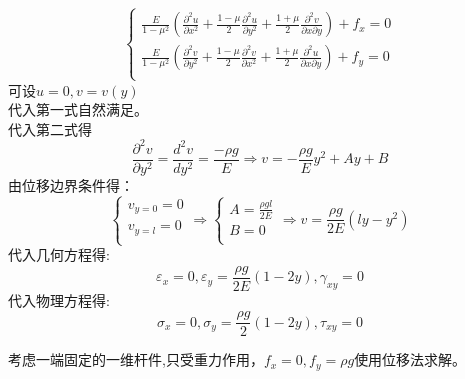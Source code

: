	\begin{remark}
		\[	\begin{cases}
		\frac{E}{1-\mu ^2}\left( \frac{\partial ^2u}{\partial x^2}+\frac{1-\mu}{2}\frac{\partial ^2u}{\partial y^2}+\frac{1+\mu}{2}\frac{\partial ^2v}{\partial x\partial y} \right) +f_x=0\\
		\frac{E}{1-\mu ^2}\left( \frac{\partial ^2v}{\partial y^2}+\frac{1-\mu}{2}\frac{\partial ^2v}{\partial x^2}+\frac{1+\mu}{2}\frac{\partial ^2u}{\partial x\partial y} \right) +f_y=0\\
		\end{cases}\]
		可设$u=0,v=v\left( y \right) $\\
		代入第一式自然满足。\\
		代入第二式得\[\frac{\partial ^2v}{\partial y^2}=\frac{d^2v}{dy^2}=\frac{-\rho g}{E}\Longrightarrow v=-\frac{\rho g}{E}y^2+Ay+B\]
		由位移边界条件得：\[\begin{cases}
		v_{y=0}=0\\
		v_{y=l}=0\\
		\end{cases}\Longrightarrow \begin{cases}
		A=\frac{\rho gl}{2E}\\
		B=0\\
		\end{cases}\Longrightarrow v=\frac{\rho g}{2E}\left( ly-y^2 \right)\]
		代入几何方程得:\[\varepsilon _x=0,\varepsilon _y=\frac{\rho g}{2E}\left( 1-2y \right) ,\gamma _{xy}=0\]
		代入物理方程得:\[\sigma _x=0,\sigma _y=\frac{\rho g}{2}\left( 1-2y \right) ,\tau _{xy}=0\]
	\end{remark}
\begin{example}
	考虑一端固定的一维杆件,只受重力作用，$f_x=0,f_y=\rho g$使用位移法求解。
\end{example}
